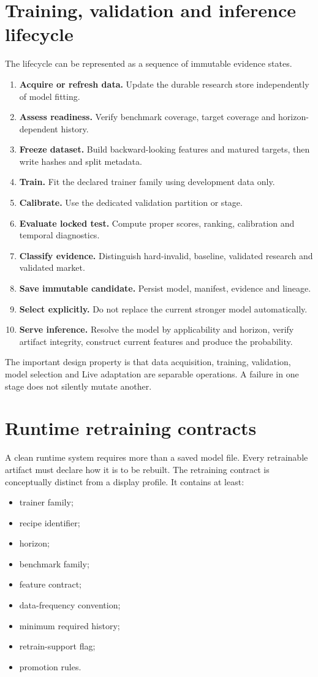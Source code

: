 \documentclass[11pt]{article}
\begin{document}
\section{Training, validation and inference lifecycle}
The lifecycle can be represented as a sequence of immutable evidence states.
\begin{enumerate}[itemsep=0.2em]
\item \textbf{Acquire or refresh data.} Update the durable research store independently of model fitting.
\item \textbf{Assess readiness.} Verify benchmark coverage, target coverage and horizon-dependent history.
\item \textbf{Freeze dataset.} Build backward-looking features and matured targets, then write hashes and split metadata.
\item \textbf{Train.} Fit the declared trainer family using development data only.
\item \textbf{Calibrate.} Use the dedicated validation partition or stage.
\item \textbf{Evaluate locked test.} Compute proper scores, ranking, calibration and temporal diagnostics.
\item \textbf{Classify evidence.} Distinguish hard-invalid, baseline, validated research and validated market.
\item \textbf{Save immutable candidate.} Persist model, manifest, evidence and lineage.
\item \textbf{Select explicitly.} Do not replace the current stronger model automatically.
\item \textbf{Serve inference.} Resolve the model by applicability and horizon, verify artifact integrity, construct current features and produce the probability.
\end{enumerate}

The important design property is that data acquisition, training, validation, model selection and Live adaptation are separable operations. A failure in one stage does not silently mutate another.

\section{Runtime retraining contracts}
A clean runtime system requires more than a saved model file. Every retrainable artifact must declare how it is to be rebuilt. The retraining contract is conceptually distinct from a display profile. It contains at least:
\begin{itemize}[itemsep=0.15em]
\item trainer family;
\item recipe identifier;
\item horizon;
\item benchmark family;
\item feature contract;
\item data-frequency convention;
\item minimum required history;
\item retrain-support flag;
\item promotion rules.
\end{itemize}
\end{document}
